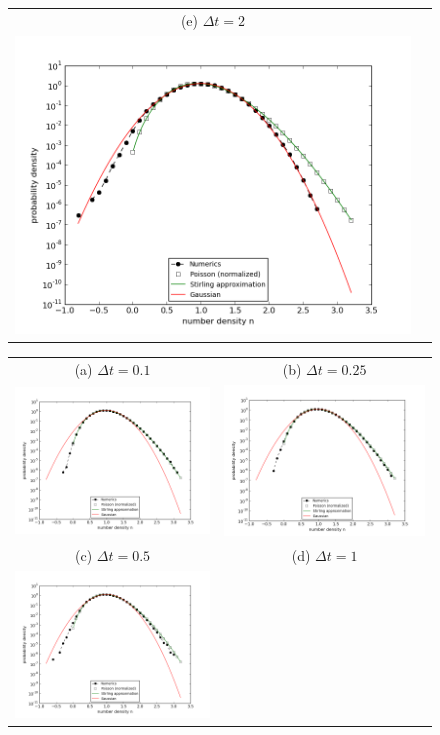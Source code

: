 \documentclass{article}
\begin{document}
\begin{figure}
\begin{tabular}{cc}
(e) $\Delta t=2$ & \\
\includegraphics[width=0.5\linewidth]{fig1/3d_DIFF_dt2_hist.png} &
\end{tabular}
\caption{\label{fig_3d_DIFF_hist}}
\end{figure}

\begin{figure}
\begin{center}
\end{center}
\begin{tabular}{cc}
(a) $\Delta t=0.1$ & (b) $\Delta t=0.25$ \\
\includegraphics[width=0.5\linewidth]{fig1/3d_REACT_dt0.1_hist.png} &
\includegraphics[width=0.5\linewidth]{fig1/3d_REACT_dt0.25_hist.png} \\
(c) $\Delta t=0.5$ & (d) $\Delta t=1$ \\
\includegraphics[width=0.5\linewidth]{fig1/3d_REACT_dt0.5_hist.png} &

\end{tabular}
\end{figure}
\end{document}
